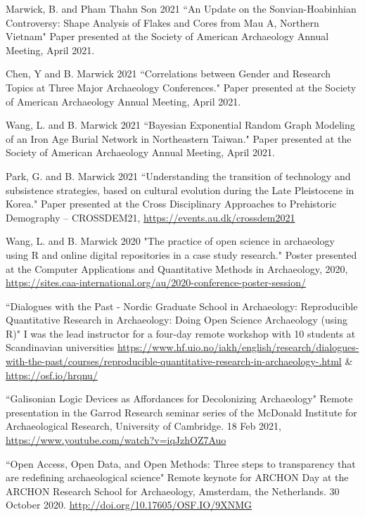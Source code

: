 \ind Marwick, B. and Pham Thahn Son 2021 ``An Update on the Sonvian-Hoabinhian Controversy: Shape Analysis of Flakes and Cores from Mau A, Northern Vietnam" Paper presented at the Society of American Archaeology Annual Meeting, April 2021. 

\ind Chen, Y and B. Marwick 2021 ``Correlations between Gender and Research Topics at Three Major Archaeology Conferences." Paper presented at the Society of American Archaeology Annual Meeting, April 2021. 

\ind Wang, L. and B. Marwick 2021 ``Bayesian Exponential Random Graph Modeling of an Iron Age Burial Network in Northeastern Taiwan." Paper presented at the Society of American Archaeology Annual Meeting, April 2021.  

\ind Park, G. and B. Marwick 2021 ``Understanding the transition of technology and subsistence strategies, based on cultural evolution during the Late Pleistocene in Korea." Paper presented at the Cross Disciplinary Approaches to Prehistoric Demography – CROSSDEM21,  \url{https://events.au.dk/crossdem2021}  

\ind Wang, L. and B. Marwick 2020 "The practice of open science in archaeology using R and online digital repositories in a case study research." Poster presented at the Computer Applications and Quantitative Methods in Archaeology, 2020,  \url{https://sites.caa-international.org/au/2020-conference-poster-session/}   

\ind ``Dialogues with the Past - Nordic Graduate School in Archaeology: Reproducible Quantitative Research in Archaeology: Doing Open Science Archaeology (using R)" I was the lead instructor for a four-day remote workshop with 10 students at Scandinavian universities  \url{https://www.hf.uio.no/iakh/english/research/dialogues-with-the-past/courses/reproducible-quantitative-research-in-archaeology-.html} \&  \url{https://osf.io/hrqnu/}  

\ind ``Galisonian Logic Devices as Affordances for Decolonizing Archaeology" Remote presentation in the Garrod Research seminar series of the McDonald Institute for Archaeological Research, University of Cambridge. 18 Feb 2021,  \url{https://www.youtube.com/watch?v=iqJzhOZ7Auo}  

\ind ``Open Access, Open Data, and Open Methods: Three steps to transparency that are redefining archaeological science" Remote keynote for ARCHON Day at the ARCHON Research School for Archaeology, Amsterdam, the Netherlands. 30 October 2020.  \url{http://doi.org/10.17605/OSF.IO/9XNMG} 

